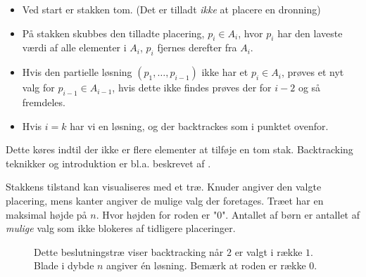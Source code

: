 \documentclass[draft,a4paper,11pt]{article}
\begin{document}
\begin{itemize}
\item Ved start er stakken tom. (Det er tilladt \emph{ikke} at placere en dronning)
\item På stakken skubbes den tilladte placering, $p_i \in A_i$, hvor $p_i$ har den laveste værdi af alle elementer i $A_i$, $p_i$ fjernes derefter fra $A_i$.
\item Hvis den partielle løsning $(p_1,\ldots,p_{i-1})$ ikke har et $p_i \in A_i$, prøves et nyt valg for $p_{i-1} \in A_{i-1}$, hvis dette ikke findes prøves der for $i-2$ og så fremdeles. 
\item Hvis $i=k$ har vi en løsning, og der backtrackes som i punktet ovenfor.
\end{itemize}
Dette køres indtil der ikke er flere elementer at tilføje en tom stak.
Backtracking teknikker og introduktion er bl.a. beskrevet af \cite{Golomb72}.

Stakkens tilstand kan visualiseres med et træ. Knuder angiver den valgte placering, mens kanter angiver de mulige valg der foretages. Træet har en maksimal højde på $n$. Hvor højden for roden er "0". Antallet af børn er antallet af \emph{mulige} valg som ikke blokeres af tidligere placeringer. 

\begin{figure}[!h]
\begin{center}

\begin{tikzpicture}
\end{tikzpicture}
	
\end{center}
\end{figure}



\begin{figure}[!h]
\begin{center}
	


\caption{
Dette beslutningstræ viser backtracking når $2$ er valgt i række $1$. Blade i dybde $n$ angiver én løsning. Bemærk at roden er række 0.}
\label{fig:tree}
\end{center}
\end{figure}
\end{document}
